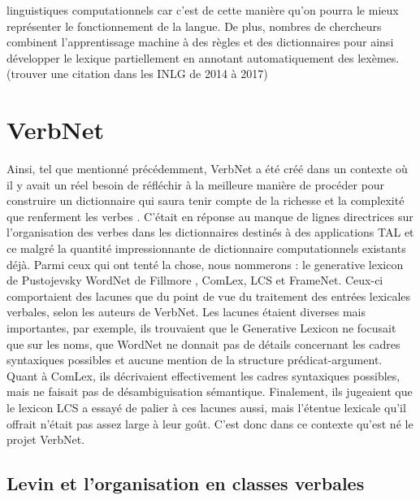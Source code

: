 linguistiques computationnels car c'est de cette manière qu'on pourra le mieux représenter le fonctionnement de la langue. De plus, nombres de chercheurs combinent l'apprentissage machine à des règles et des dictionnaires pour ainsi développer le lexique partiellement en annotant automatiquement des lexèmes.(trouver une citation dans les INLG de 2014 à 2017)

\section{VerbNet}

Ainsi, tel que mentionné précédemment, VerbNet a été créé dans un contexte où il y avait un réel besoin de réfléchir à la meilleure manière de procéder pour construire un dictionnaire qui saura tenir compte de la richesse et la complexité que renferment les verbes \citep{KipperClassBasedConstructionVerb2000}. C'était en réponse au manque de lignes directrices sur l'organisation des verbes dans les dictionnaires destinés à des applications TAL et ce malgré la quantité impressionnante de dictionnaire computationnels existants déjà. Parmi ceux qui ont tenté la chose, nous nommerons : le generative lexicon de Pustojevsky \citep{PustejovskyGenerativeLexicon1991} WordNet de Fillmore \citep{MillerWordNetLexicalDatabase1995}, ComLex\citep{Grishman:1994:CSB:991886.991931}, LCS\citep{13776} et FrameNet\citep{BakerBerkeleyFrameNetProject1998}. Ceux-ci comportaient des lacunes que du point de vue du traitement des entrées lexicales verbales, selon les auteurs de VerbNet. Les lacunes étaient diverses mais importantes, par exemple, ils trouvaient que le Generative Lexicon ne focusait que sur les noms, que WordNet ne donnait pas de détails concernant les cadres syntaxiques possibles  et aucune mention de la structure prédicat-argument. Quant à ComLex, ils décrivaient effectivement les cadres syntaxiques possibles, mais ne faisait pas de désambiguisation sémantique. Finalement, ils jugeaient que le lexicon LCS a essayé de palier à ces lacunes aussi, mais l'étentue lexicale qu'il offrait n'était pas assez large à leur goût\citep{SchulerVerbnetBroadcoverageComprehensive2005}. C'est donc dans ce contexte qu'est né le projet VerbNet.

\subsection{Levin et l'organisation en classes verbales}

